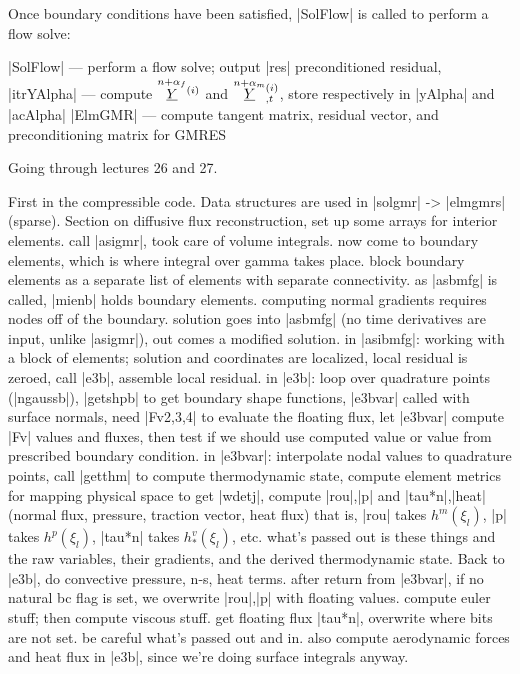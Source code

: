 \documentclass[11pt]{article}
\begin{document}
Once boundary conditions have been satisfied, |SolFlow| is called to perform a flow solve:
\begin{outline}[deep]
\1 |SolFlow| --- perform a flow solve; output |res| preconditioned residual, 
	\2 |itrYAlpha| --- compute $\oset{n+\alpha_f}{\ul{Y}}^{(i)}$ and $\oset{n+\alpha_m}{\ul{Y}}^{(i)}_{,t}$, store respectively in |yAlpha| and |acAlpha|
	\2 |ElmGMR| --- compute tangent matrix, residual vector, and preconditioning matrix for GMRES
\end{outline}

Going through lectures 26 and 27.

First in the compressible code.
Data structures are used in |solgmr| -> |elmgmrs| (sparse). Section on diffusive flux reconstruction, set up some arrays for interior elements. call |asigmr|, took care of volume integrals. now come to boundary elements, which is where integral over gamma takes place. block boundary elements as a separate list of elements with separate connectivity. as |asbmfg| is called, |mienb| holds boundary elements. computing normal gradients requires nodes off of the boundary. solution goes into |asbmfg| (no time derivatives are input, unlike |asigmr|), out comes a modified solution. in |asibmfg|: working with a block of elements; solution and coordinates are localized, local residual is zeroed, call |e3b|, assemble local residual. in |e3b|: loop over quadrature points (|ngaussb|), |getshpb| to get boundary shape functions, |e3bvar| called with surface normals, need |Fv{2,3,4}| to evaluate the floating flux, let |e3bvar| compute |Fv| values and fluxes, then test if we should use computed value or value from prescribed boundary condition. in |e3bvar|: interpolate nodal values to quadrature points, call |getthm| to compute thermodynamic state, compute element metrics for mapping physical space to get |wdetj|, compute |rou|,|p| and |tau*n|,|heat| (normal flux, pressure, traction vector, heat flux) that is, |rou| takes $h^m(\xi_l)$, |p| takes $h^p(\xi_l)$, |tau*n| takes $h^v_*(\xi_l)$, etc. what's passed out is these things and the raw variables, their gradients, and the derived thermodynamic state. Back to |e3b|, do convective pressure, n-s, heat terms. after return from |e3bvar|, if no natural bc flag is set, we overwrite |rou|,|p| with floating values. compute euler stuff; then compute viscous stuff. get floating flux |tau*n|, overwrite where bits are not set. be careful what's passed out and in. also compute aerodynamic forces and heat flux in |e3b|, since we're doing surface integrals anyway.
\end{document}
